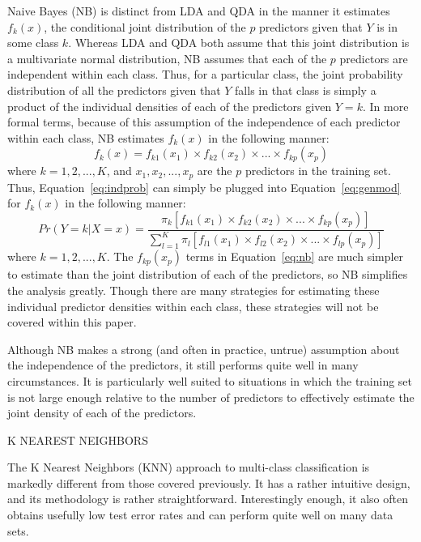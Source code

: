 \documentclass[12pt]{article}
\begin{document}
Naive Bayes (NB) is distinct from LDA and QDA in the manner it estimates $f_k(x)$, 
the conditional joint distribution of the $p$ predictors given that $Y$ is in some 
class $k$.  Whereas LDA and QDA both assume that this joint distribution is a multivariate 
normal distribution, NB assumes that each of the $p$ predictors are independent within each 
class.  Thus, for a particular class, the joint probability distribution of all the 
predictors given that $Y$ falls in that class is simply a product of the individual densities 
of each of the predictors given $Y = k$.  In more formal terms, because of this assumption of 
the independence of each predictor within each class, NB estimates $f_k(x)$ in the following 
manner:
\begin{equation}
  \label{eq:indprob}
  f_k(x) = f_{k1}(x_1) \times f_{k2}(x_2) \times ... \times f_{kp}(x_p)
\end{equation} 
where $k = 1, 2, ..., K$, and $x_1, x_2, ..., x_p$ are the $p$ predictors in the training set.  
Thus, Equation~\eqref{eq:indprob} can simply be plugged into Equation~\eqref{eq:genmod} for 
$f_k(x)$ in the following manner:
\begin{equation}
  \label{eq:nb}
   Pr(Y = k | X = x) =
  \frac{\pi_k [f_{k1}(x_1) \times f_{k2}(x_2) \times ... \times f_{kp}(x_p)]} 
  {\sum_{l = 1} ^ {K} \pi_l [f_{l1}(x_1) \times f_{l2}(x_2) \times ... \times f_{lp}(x_p)]}
\end{equation} 
where $k = 1, 2, ..., K$.  The $f_{kp}(x_p)$ terms in Equation~\eqref{eq:nb} are much simpler 
to estimate than the joint distribution of each of the predictors, so NB simplifies the 
analysis greatly.  Though there are many strategies for estimating these individual predictor 
densities within each class, these strategies will not be covered within this paper.  

Although NB makes a strong (and often in practice, untrue) assumption about the independence 
of the predictors, it still performs quite well in many circumstances.  It is particularly 
well suited to situations in which the training set is not large enough relative to the 
number of predictors to effectively estimate the joint density of each of the predictors.  

K NEAREST NEIGHBORS

The K Nearest Neighbors (KNN) approach to multi-class classification is markedly different 
from those covered previously.  It has a rather intuitive design, and its methodology is 
rather straightforward.  Interestingly enough, it also often obtains usefully low test 
error rates and can perform quite well on many data sets.  
\end{document}
